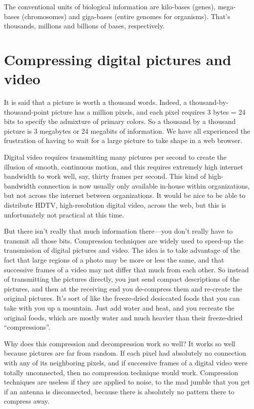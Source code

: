 \documentclass[12pt]{book}
\begin{document}
The conventional units of biological information
are kilo-bases (genes), mega-bases (chromosomes) and giga-bases (entire genomes for organisms).
That's thousands, millions and billions of bases, respectively.

\section*{Compressing digital pictures and video}

It is said that
a picture is worth a thousand words. Indeed, a thousand-by-thousand-point picture has a million
pixels, and each pixel requires 3 bytes = 24 bits to specify the admixture of primary colors.
So a thousand by a thousand picture is 3 megabytes 
or 24 megabits
of information. We have all
experienced the frustration of having to wait for a large picture to take shape in a web browser.  
 
Digital video requires transmitting many pictures per second  
to create the illusion
of smooth, continuous motion, 
and this requires extremely high internet bandwidth to work well,  
say, thirty frames per second.
This kind of high-bandwidth
connection is now usually only available in-house within organizations, but not across the internet
between organizations.
It would be nice to be able to distribute HDTV, high-resolution digital video, across the web,
but this is unfortunately not practical at this time.
 
But there isn't really that much information there---you don't 
really have to transmit all those bits.
Compression techniques are widely used to speed-up the transmission of digital pictures
and video.  The idea is to take advantage of the fact that large regions of a photo may
be more or less the same, and that successive frames of a video may not differ that much from
each other.  So instead of transmitting the pictures directly, you just send compact descriptions
of the pictures, and then at the receiving end you de-compress them and 
re-create the original pictures.
It's sort of like the freeze-dried desiccated foods that you can take with you up a mountain.
Just add water and heat, and you recreate the original foods, which are mostly water and much
heavier than their freeze-dried ``compressions''.
 
Why does this compression and decompression work so well?  
It works so well because pictures are far from random.  If each
pixel had absolutely no connection with any of its neighboring pixels, and if successive frames
of a digital video were totally unconnected, then no compression technique would work.
Compression techniques are useless if they are applied to noise, to the mad jumble that you get
if an antenna is disconnected, because there is absolutely no pattern there to compress away.
 
\end{document}
